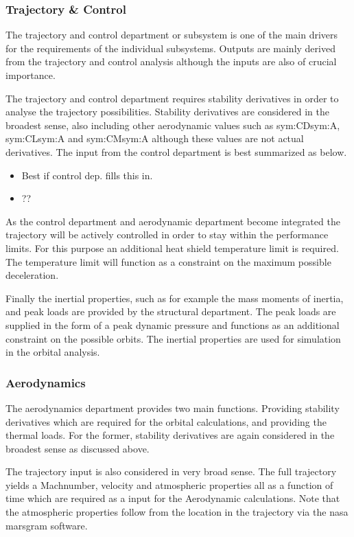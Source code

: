 \subsubsection{Trajectory \& Control}

The trajectory and control department or subsystem is one of the main drivers for the requirements of the individual subsystems. Outputs are mainly derived from the trajectory and control analysis although the inputs are also of crucial importance. 

The trajectory and control department requires stability derivatives in order to analyse the trajectory possibilities. Stability derivatives are considered in the broadest sense, also including other aerodynamic values such as \gls{sym:CD}\gls{sym:A}, \gls{sym:CL}\gls{sym:A} and \gls{sym:CM}\gls{sym:A} although these values are not actual derivatives. The input from the control department is  best summarized as below.

\begin{itemize}
\item Best if control dep. fills this in.
\item ??
\end{itemize}

As the control department and aerodynamic department become integrated the trajectory will be actively controlled in order to stay within the performance limits. For this purpose an additional heat shield temperature limit is required. The temperature limit will function as a constraint on the maximum possible deceleration.

Finally the inertial properties, such as for example the mass moments of inertia, and peak loads are provided by the structural department. The peak loads are supplied in the form of a peak dynamic pressure and functions as an additional constraint on the possible orbits. The inertial properties are used for simulation in the orbital analysis. 

\subsubsection{Aerodynamics}
The aerodynamics department provides two main functions. Providing stability derivatives which are required for the orbital calculations, and providing the thermal loads. 
For the former, stability derivatives are again considered in the broadest sense as discussed above. 

The trajectory input is also considered in very broad sense. The full trajectory yields a Machnumber, velocity and atmospheric properties all as a function of time which are required as a input for the Aerodynamic calculations. Note that the atmospheric properties follow from the location in the trajectory via the \gls{nasa} \gls{marsgram} software\cite{Justus2001}.

